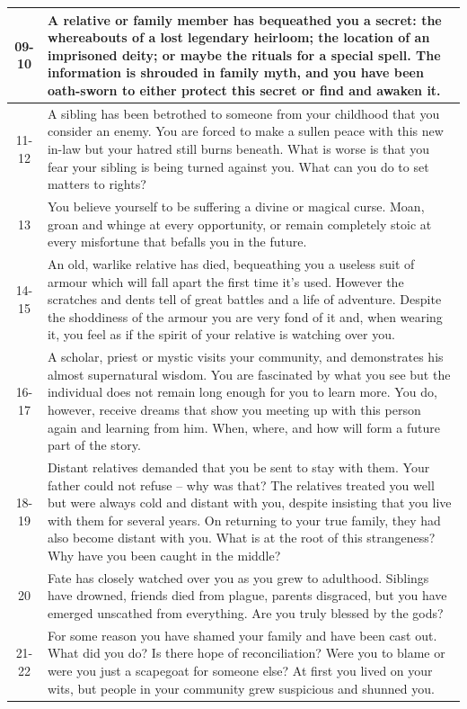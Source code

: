 \documentclass[10pt]{article}
\begin{document}
\begin{longtable}{|c|p{12cm}|}
\hline
09-10 & A relative or family member has bequeathed you a secret: the whereabouts of a lost legendary heirloom; the location of an imprisoned deity; or maybe the rituals for a special spell. The information is shrouded in family myth, and you have been oath-sworn to either protect this secret or find and awaken it. \\
\hline
11-12 & A sibling has been betrothed to someone from your childhood that you consider an enemy. You are forced to make a sullen peace with this new in-law but your hatred still burns beneath. What is worse is that you fear your sibling is being turned against you. What can you do to set matters to rights? \\
\hline
13 & You believe yourself to be suffering a divine or magical curse. Moan, groan and whinge at every opportunity, or remain completely stoic at every misfortune that befalls you in the future. \\
\hline
14-15 & An old, warlike relative has died, bequeathing you a useless suit of armour which will fall apart the first time it's used. However the scratches and dents tell of great battles and a life of adventure. Despite the shoddiness of the armour you are very fond of it and, when wearing it, you feel as if the spirit of your relative is watching over you. \\
\hline
16-17 & A scholar, priest or mystic visits your community, and demonstrates his almost supernatural wisdom. You are fascinated by what you see but the individual does not remain long enough for you to learn more. You do, however, receive dreams that show you meeting up with this person again and learning from him. When, where, and how will form a future part of the story. \\
\hline
18-19 & Distant relatives demanded that you be sent to stay with them. Your father could not refuse – why was that? The relatives treated you well but were always cold and distant with you, despite insisting that you live with them for several years. On returning to your true family, they had also become distant with you. What is at the root of this strangeness? Why have you been caught in the middle? \\
\hline
20 & Fate has closely watched over you as you grew to adulthood. Siblings have drowned, friends died from plague, parents disgraced, but you have emerged unscathed from everything. Are you truly blessed by the gods? \\
\hline
21-22 & For some reason you have shamed your family and have been cast out. What did you do? Is there hope of reconciliation? Were you to blame or were you just a scapegoat for someone else? At first you lived on your wits, but people in your community grew suspicious and shunned you. \\

\end{longtable}
\end{document}

